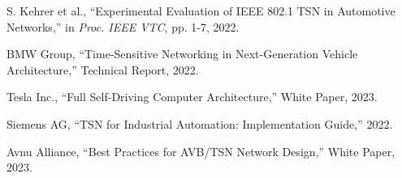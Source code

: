 \documentclass[twocolumn,10pt]{article}
\begin{document}
\begin{thebibliography}{99}
S. Kehrer et al., ``Experimental Evaluation of IEEE 802.1 TSN in Automotive Networks,'' in \textit{Proc. IEEE VTC}, pp. 1-7, 2022.

BMW Group, ``Time-Sensitive Networking in Next-Generation Vehicle Architecture,'' Technical Report, 2022.

Tesla Inc., ``Full Self-Driving Computer Architecture,'' White Paper, 2023.

Siemens AG, ``TSN for Industrial Automation: Implementation Guide,'' 2022.

Avnu Alliance, ``Best Practices for AVB/TSN Network Design,'' White Paper, 2023.

\end{thebibliography}
\end{document}
